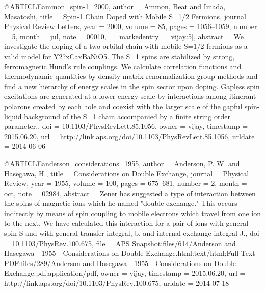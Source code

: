 @ARTICLE{ammon_spin-1_2000,
  author = {Ammon, Beat and Imada, Masatoshi},
  title = {Spin-1 {Chain} {Doped} with {Mobile} {S}=1/2 {Fermions}},
  journal = {Physical Review Letters},
  year = {2000},
  volume = {85},
  pages = {1056--1059},
  number = {5},
  month = jul,
  note = {00010},
  __markedentry = {[vijay:5]},
  abstract = {We investigate the doping of a two-orbital chain with mobile S=1/2
	fermions as a valid model for Y2?xCaxBaNiO5. The S=1 spins are stabilized
	by strong, ferromagnetic Hund's rule couplings. We calculate correlation
	functions and thermodynamic quantities by density matrix renormalization
	group methods and find a new hierarchy of energy scales in the spin
	sector upon doping. Gapless spin excitations are generated at a lower
	energy scale by interactions among itinerant polarons created by
	each hole and coexist with the larger scale of the gapful spin-liquid
	background of the S=1 chain accompanied by a finite string order
	parameter.},
  doi = {10.1103/PhysRevLett.85.1056},
  owner = {vijay},
  timestamp = {2015.06.20},
  url = {http://link.aps.org/doi/10.1103/PhysRevLett.85.1056},
  urldate = {2014-06-06}
}

@ARTICLE{anderson_considerations_1955,
  author = {Anderson, P. W. and Hasegawa, H.},
  title = {Considerations on {Double} {Exchange}},
  journal = {Physical Review},
  year = {1955},
  volume = {100},
  pages = {675--681},
  number = {2},
  month = oct,
  note = {02984},
  abstract = {Zener has suggested a type of interaction between the spins of magnetic
	ions which he named "double exchange." This occurs indirectly by
	means of spin coupling to mobile electrons which travel from one
	ion to the next. We have calculated this interaction for a pair of
	ions with general spin S and with general transfer integral, b, and
	internal exchange integral J.},
  doi = {10.1103/PhysRev.100.675},
  file = {APS Snapshot:files/614/Anderson and Hasegawa - 1955 - Considerations on Double Exchange.html:text/html;Full Text PDF:files/289/Anderson and Hasegawa - 1955 - Considerations on Double Exchange.pdf:application/pdf},
  owner = {vijay},
  timestamp = {2015.06.20},
  url = {http://link.aps.org/doi/10.1103/PhysRev.100.675},
  urldate = {2014-07-18}
}

